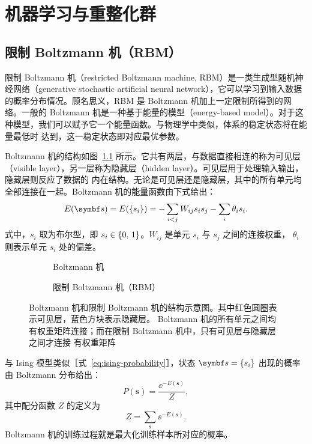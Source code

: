 \chapter{机器学习与重整化群}

\section{限制 Boltzmann 机（RBM）}

限制 Boltzmann 机（restricted Boltzmann machine, RBM）是一类生成型随机神经网络（gen\-er\-a\-tive
stochastic artificial neural network），它可以学习到输入数据的概率分布情况。顾名思义，RBM 是
Boltzmann 机加上一定限制所得到的网络。一般的 Boltzmann 机是一种基于能量的模型（energy-based
model）。对于这种模型，我们可以赋予它一个能量函数。与物理学中类似，体系的稳定状态将在能量最低时
达到，这一稳定状态即对应最优参数。

Boltzmann 机的结构如图~\ref{fig:boltzmann-machine} 所示。它共有两层，与数据直接相连的称为可见层
（visible layer），另一层称为隐藏层（hidden layer）。可见层用于处理输入输出，隐藏层则反应了数据的
内在结构。无论是可见层还是隐藏层，其中的所有单元均全部连接在一起。Boltzmann 机的能量函数由下式给出：
\begin{equation}
  E(\bm{s}) = E(\q{s_i}) = - \sum_{i<j} W_{ij} s_i s_j - \sum_i \theta_i s_i.
\end{equation}
式中，$s_i$ 取为布尔型，即 $s_i\in{\{0,\,1\}}$。$W_{ij}$ 是单元 $s_i$ 与 $s_j$ 之间的连接权重，
$\theta_i$ 则表示单元 $s_i$ 处的偏差。

\begin{figure}[htb]
  \centering
  \begin{subfigure}[b]{0.45\textwidth}
    \centering
    \caption{Boltzmann 机}
    \label{fig:boltzmann-machine}
  \end{subfigure}
  \begin{subfigure}[b]{0.45\textwidth}
    \centering
    \vspace{0.4cm}
    \caption{限制 Boltzmann 机（RBM）}
    \label{fig:rbm}
  \end{subfigure}
  \caption{Boltzmann 机和限制 Boltzmann 机的结构示意图。其中红色圆圈表示可见层，蓝色方块表示隐藏层。
  Boltzmann 机的所有单元之间均有权重矩阵连接；而在限制 Boltzmann 机中，只有可见层与隐藏层之间才连接
  有权重矩阵}
\end{figure}

与 Ising 模型类似［式~\eqref{eq:ising-probability}］，状态 $\bm{s}=\q{s_i}$ 出现的概率由 Boltzmann
分布给出：
\begin{equation}
  \label{eq:boltzmann-machine-probability}
  P(\bm{s}) = \frac{\ee^{-E(\bm{s})}}{Z},
\end{equation}
其中配分函数 $Z$ 的定义为
\begin{equation}
  Z = \sum_{\bm{s}} \ee^{-E(\bm{s})}.
\end{equation}
Boltzmann 机的训练过程就是最大化训练样本所对应的概率。

